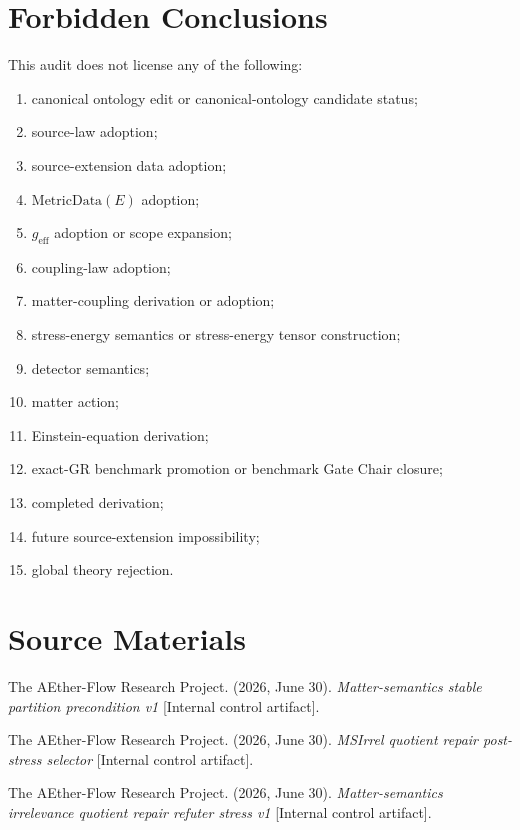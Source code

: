\section{Forbidden Conclusions}

This audit does not license any of the following:
\begin{enumerate}
  \item canonical ontology edit or canonical-ontology candidate status;
  \item source-law adoption;
  \item source-extension data adoption;
  \item \(\mathrm{MetricData}(E)\) adoption;
  \item \(g_{\mathrm{eff}}\) adoption or scope expansion;
  \item coupling-law adoption;
  \item matter-coupling derivation or adoption;
  \item stress-energy semantics or stress-energy tensor construction;
  \item detector semantics;
  \item matter action;
  \item Einstein-equation derivation;
  \item exact-GR benchmark promotion or benchmark Gate Chair closure;
  \item completed derivation;
  \item future source-extension impossibility;
  \item global theory rejection.
\end{enumerate}

\section{Source Materials}

The AEther-Flow Research Project. (2026, June 30). \emph{Matter-semantics
stable partition precondition v1} [Internal control artifact].

The AEther-Flow Research Project. (2026, June 30). \emph{MSIrrel quotient
repair post-stress selector} [Internal control artifact].

The AEther-Flow Research Project. (2026, June 30). \emph{Matter-semantics
irrelevance quotient repair refuter stress v1} [Internal control artifact].
